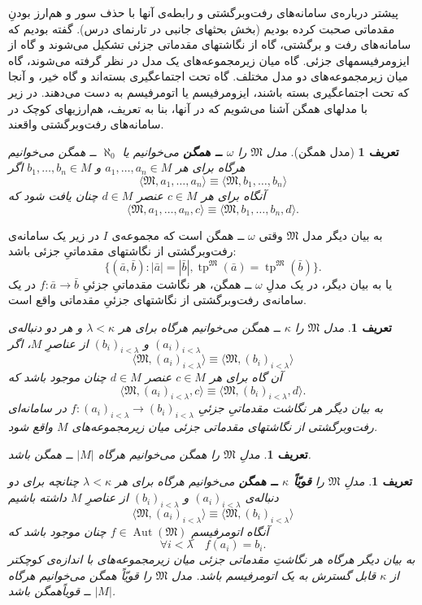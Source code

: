 \documentclass[12pt,a4paper]{report}
\theoremstyle{colorhead}
\newtheorem{defn}[thm]{تعریف}
\DeclareMathOperator{\tp}{tp}
\DeclareMathOperator{\Aut}{Aut}
\begin{document}
  پیشتر درباره‌ی سامانه‌های رفت‌وبرگشتی و رابطه‌ی آنها با حذف سور و 
  هم‌ارز بودنِ مقدماتی صحبت کرده‌ بودیم (بخش بحثهای جانبی در تارنمای درس).
  گفته بودیم که سامانه‌های رفت و برگشتی، گاه
  از نگاشتهای مقدماتی جزئی تشکیل می‌شوند و گاه از ایزومرفیسمهای جزئی. گاه میان زیرمجموعه‌های یک مدل در نظر گرفته می‌شوند، گاه میان زیرمجموعه‌های دو مدل مختلف. گاه تحت اجتماعگیری بسته‌اند و گاه خیر،‌ و آنجا که تحت اجتماعگیری بسته باشند، ایزومرفیسم یا اتومرفیسم به دست می‌دهند. در زیر با مدلهای همگن آشنا می‌شویم که در‌ آنها، بنا به تعریف، هم‌ارزیهای کوچک در سامانه‌های رفت‌وبرگشتی واقعند. 
\begin{defn}[مدل همگن]
مدل
$\mathfrak{M}$
را 
\textbf{$\omega$
ــ
همگن
}
می‌خوانیم یا
$\aleph_0$
ــ
همگن می‌خوانیم هرگاه برای هر
$a_1,\ldots, a_n\in M$
و 
$b_1,\ldots,b_n\in M$
اگر
\[
\langle \mathfrak{M},a_1,\ldots,a_n\rangle \equiv \langle \mathfrak{M},b_1,\ldots,b_n\rangle
\]
آنگاه برای هر
$c\in M$
عنصر
$d\in M$
چنان یافت شود که
\[
\langle\mathfrak{M},a_1,\ldots,a_n,c\rangle \equiv \langle \mathfrak{M},b_1,\ldots,b_n, d\rangle.
\]
\end{defn}
به بیان دیگر مدل
$\mathfrak{M}$
وقتی
$\omega$
ــ
همگن است که مجموعه‌ی
$I$
در زیر یک سامانه‌ی رفت‌وبرگشتی از نگاشتهای مقدماتیِ جزئی باشد:
\[
\{(\bar{a},\bar{b}):|\bar{a}|=|\bar{b}|,  \tp^\mathfrak{M}(\bar{a})= \tp^\mathfrak{M}(\bar{b})\}.
\]
یا به بیان دیگر، در یک مدلِ
$\omega$
ــ
همگن، هر نگاشت مقدماتیِ جزئیِ
$f:\bar{a}\to \bar{b}$
در یک سامانه‌ی رفت‌وبرگشتی از نگاشتهای جزئیِ مقدماتی واقع است.
\begin{defn}
مدل
$\mathfrak{M}$
را
$\kappa$
ــ
همگن می‌خوانیم هرگاه برای هر
$\lambda<\kappa$
و هر
دو دنباله‌ی
$(a_i)_{i<\lambda}$
و
$(b_i)_{i<\lambda}$
از عناصرِ
$M$،
اگر
\[
\langle \mathfrak{M},(a_i)_{i<\lambda}\rangle \equiv \langle \mathfrak{M},(b_i)_{i<\lambda}\rangle
\]
آن گاه برای هر
$c\in M$
عنصر
$d\in M$
چنان موجود باشد که 
\[
\langle \mathfrak{M},(a_i)_{i<\lambda},c\rangle \equiv \langle \mathfrak{M},(b_i)_{i<\lambda},d\rangle.
\]
به بیان دیگر هر نگاشت مقدماتیِ
جزئیِ
$f:(a_i)_{i<\lambda}\to (b_i)_{i<\lambda}$
در سامانه‌ای رفت‌وبرگشتی از نگاشتهای مقدماتی جزئی میان زیرمجموعه‌های
$M$
واقع شود.
\end{defn}
\begin{defn}
مدلِ
$\mathfrak{M}$
را همگن می‌خوانیم هرگاه
$|M|$
ــ
همگن باشد.
\end{defn}
\begin{defn}
مدلِ
$\mathfrak{M}$
را
\textbf{ قویّاً 
$\kappa$
ــ
همگن }
می‌خوانیم هرگاه برای هر
$\lambda<\kappa$
چنانچه برای دو دنباله‌ی
$(a_i)_{i<\lambda}$
و
$(b_i)_{i<\lambda}$
از عناصرِ
$M$
داشته باشیم
\[
\langle \mathfrak{M},(a_i)_{i<\lambda}\rangle \equiv 
\langle \mathfrak{M},(b_i)_{i<\lambda}\rangle 
\]
آنگاه اتومرفیسمِ
$f\in \Aut(\mathfrak{M})$
چنان موجود باشد که
\[
\forall i<\lambda \quad f(a_i)=b_i.
\]
به بیان دیگر هرگاه هر نگاشتِ 
مقدماتی جزئی میان زیرمجموعه‌های  با اندازه‌ی کوچکتر از
$\kappa$
قابل گسترش به یک اتومرفیسم باشد. مدل
$\mathfrak{M}$
را قویّاً همگن می‌خوانیم هرگاه
$|M|$
ــ
قویاً‌همگن باشد.
\end{defn}
\end{document}
